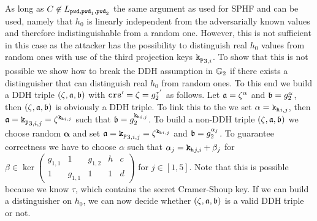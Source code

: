 As long as $C\not\in L_{\mathtt{pwd}, \mathtt{pwd}_1, \mathtt{pwd}_2}$ the same argument as used for SPHF and \DSPHF can be used, namely that $h_0$ is linearly independent from the adversarially known values and therefore indistinguishable from a random one.
However, this is not sufficient in this case as the attacker has the possibility to distinguish real $h_0$ values from random ones with use of the third projection keys $\mathtt{k_p}_{3,i}$.
To show that this is not possible we show how to break the DDH assumption in $\mathbb{G}_2$ if there exists a distinguisher that can distinguish real $h_0$ from random ones.
To this end we build a DDH triple $(\zeta, \mathfrak{a}, \mathfrak{b})$ with $\mathtt{crs}'=\zeta=g_2^{\tau'}$ as follows.
Let $\mathfrak{a}=\zeta^\alpha$ and $\mathfrak{b}=g_2^\alpha$, then $(\zeta, \mathfrak{a}, \mathfrak{b})$ is obviously a DDH triple.
To link this to the \TDSPHF we set $\alpha=\mathtt{k_h}_{i,j}$, then $\mathfrak{a}=\mathtt{k_p}_{3,i,j}=\zeta^{\mathtt{k_h}_{i,j}}$ such that $\mathfrak{b}=g_2^{\mathtt{k_h}_{i,j}}$. 
To build a non-DDH triple $(\zeta, \mathfrak{a}, \mathfrak{b})$ we choose random $\bm \alpha$ and set $\mathfrak{a}=\mathtt{k_p}_{3,i,j}=\zeta^{\mathtt{k_h}_{i,j}}$ and $\mathfrak{b}=g_2^{\alpha_{j}}$.
To guarantee correctness we have to choose $\alpha$ such that $\alpha_j=\mathtt{k_h}_{j,i}+\beta_j$ for $\beta\in\ker\begin{pmatrix}
  g_{1,1} & 1 & g_{1,2} & h & c \\
  1 & g_{1,1} & 1 & 1 & d
\end{pmatrix}$ for $j\in[1,5]$.
Note that this is possible because we know $\tau$, which contains the secret Cramer-Shoup key.
If we can build a distinguisher on $h_0$, we can now decide whether $(\zeta, \mathfrak{a}, \mathfrak{b})$ is a valid DDH triple or not.


